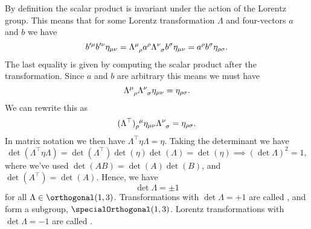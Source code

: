 \documentclass[fleqn]{NotesClass}
\newcommand{\minkowskiMetric}{\eta}
\newcommand{\trans}{{\top}}
\begin{document}
\begin{appendices}
        By definition the scalar product is invariant under the action of the Lorentz group.
        This means that for some Lorentz transformation \(\Lambda\) and four-vectors \(a\) and \(b\) we have
        \begin{equation}
            b'^\mu b'^\nu \minkowskiMetric_{\mu\nu} = \tensor{\Lambda}{^\mu_\rho} a^\rho \tensor{\Lambda}{^\nu_\sigma} b^\sigma \minkowskiMetric_{\mu\nu} = a^\rho b^\sigma \minkowskiMetric_{\rho\sigma}.
        \end{equation}
        The last equality is given by computing the scalar product after the transformation.
        Since \(a\) and \(b\) are arbitrary this means we must have
        \begin{equation}\label{eqn:lorentz transformation of metric}
            \tensor{\Lambda}{^\mu_\rho} \tensor{\Lambda}{^\nu_\sigma} \minkowskiMetric_{\mu\nu} = \minkowskiMetric_{\rho\sigma}.
        \end{equation}
        We can rewrite this as
        \begin{equation}
            \tensor{(\Lambda^\trans)}{_\rho^\mu} \minkowskiMetric_{\mu\nu} \tensor{\Lambda}{^\nu_\sigma} = \minkowskiMetric_{\rho\sigma}.
        \end{equation}
        In matrix notation we then have \(\Lambda^{\trans} \minkowskiMetric \Lambda = \minkowskiMetric\).
        Taking the determinant we have
        \begin{equation}
            \det(\Lambda^\trans \minkowskiMetric \Lambda) = \det(\Lambda^\trans) \det(\minkowskiMetric) \det(\Lambda) = \det(\minkowskiMetric) \implies (\det\Lambda)^2 = 1,
        \end{equation}
        where we've used \(\det(AB) = \det(A)\det(B)\), and \(\det(A^\trans) = \det(A)\).
        Hence, we have
        \begin{equation}
            \det \Lambda = \pm 1
        \end{equation}
        for all \(\Lambda \in \orthogonal(1, 3)\).
        Transformations with \(\det \Lambda = +1\) are called , and form a subgroup, \(\specialOrthogonal(1, 3)\).
        Lorentz transformations with \(\det \Lambda = -1\) are called .
        

\end{appendices}
\end{document}
